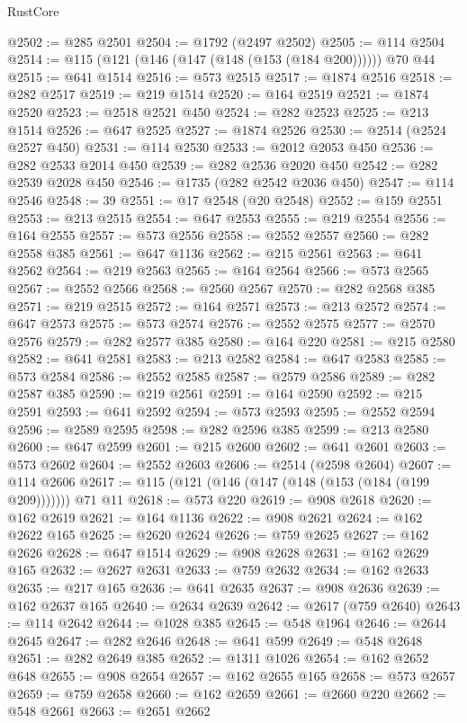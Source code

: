 \begin{lexlean}{RustCore}
\begin{coremodule}
@2502 := @285 @2501
@2504 := @1792 (@2497 @2502)
@2505 := @114 @2504
@2514 := @115 (@121 (@146 (@147 (@148 (@153 (@184 @200)))))) @70 @44
@2515 := @641 @1514
@2516 := @573 @2515
@2517 := @1874 @2516
@2518 := @282 @2517
@2519 := @219 @1514
@2520 := @164 @2519
@2521 := @1874 @2520
@2523 := @2518 @2521 @450
@2524 := @282 @2523
@2525 := @213 @1514
@2526 := @647 @2525
@2527 := @1874 @2526
@2530 := @2514 (@2524 @2527 @450)
@2531 := @114 @2530
@2533 := @2012 @2053 @450
@2536 := @282 @2533 @2014 @450
@2539 := @282 @2536 @2020 @450
@2542 := @282 @2539 @2028 @450
@2546 := @1735 (@282 @2542 @2036 @450)
@2547 := @114 @2546
@2548 := 39
@2551 := @17 @2548 (@20 @2548)
@2552 := @159 @2551
@2553 := @213 @2515
@2554 := @647 @2553
@2555 := @219 @2554
@2556 := @164 @2555
@2557 := @573 @2556
@2558 := @2552 @2557
@2560 := @282 @2558 @385
@2561 := @647 @1136
@2562 := @215 @2561
@2563 := @641 @2562
@2564 := @219 @2563
@2565 := @164 @2564
@2566 := @573 @2565
@2567 := @2552 @2566
@2568 := @2560 @2567
@2570 := @282 @2568 @385
@2571 := @219 @2515
@2572 := @164 @2571
@2573 := @213 @2572
@2574 := @647 @2573
@2575 := @573 @2574
@2576 := @2552 @2575
@2577 := @2570 @2576
@2579 := @282 @2577 @385
@2580 := @164 @220
@2581 := @215 @2580
@2582 := @641 @2581
@2583 := @213 @2582
@2584 := @647 @2583
@2585 := @573 @2584
@2586 := @2552 @2585
@2587 := @2579 @2586
@2589 := @282 @2587 @385
@2590 := @219 @2561
@2591 := @164 @2590
@2592 := @215 @2591
@2593 := @641 @2592
@2594 := @573 @2593
@2595 := @2552 @2594
@2596 := @2589 @2595
@2598 := @282 @2596 @385
@2599 := @213 @2580
@2600 := @647 @2599
@2601 := @215 @2600
@2602 := @641 @2601
@2603 := @573 @2602
@2604 := @2552 @2603
@2606 := @2514 (@2598 @2604)
@2607 := @114 @2606
@2617 := @115 (@121 (@146 (@147 (@148 (@153 (@184 (@199 @209))))))) @71 @11
@2618 := @573 @220
@2619 := @908 @2618
@2620 := @162 @2619
@2621 := @164 @1136
@2622 := @908 @2621
@2624 := @162 @2622 @165
@2625 := @2620 @2624
@2626 := @759 @2625
@2627 := @162 @2626
@2628 := @647 @1514
@2629 := @908 @2628
@2631 := @162 @2629 @165
@2632 := @2627 @2631
@2633 := @759 @2632
@2634 := @162 @2633
@2635 := @217 @165
@2636 := @641 @2635
@2637 := @908 @2636
@2639 := @162 @2637 @165
@2640 := @2634 @2639
@2642 := @2617 (@759 @2640)
@2643 := @114 @2642
@2644 := @1028 @385
@2645 := @548 @1964
@2646 := @2644 @2645
@2647 := @282 @2646
@2648 := @641 @599
@2649 := @548 @2648
@2651 := @282 @2649 @385
@2652 := @1311 @1026
@2654 := @162 @2652 @648
@2655 := @908 @2654
@2657 := @162 @2655 @165
@2658 := @573 @2657
@2659 := @759 @2658
@2660 := @162 @2659
@2661 := @2660 @220
@2662 := @548 @2661
@2663 := @2651 @2662

\end{coremodule}
\end{lexlean}

